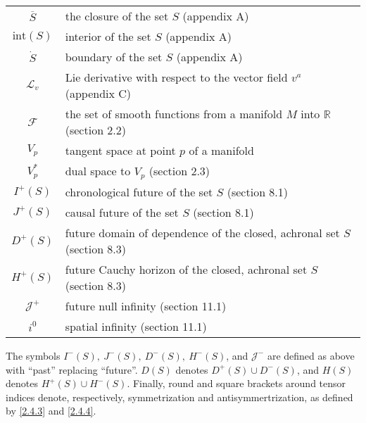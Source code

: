 \begin{table}[!ht]
    \centering
\begin{tabularx}{\textwidth}{c X}
    \toprule
    $\overline{S}$ & the closure of the set $S$ (appendix A)\\
    $\text{int}(S)$ & interior of the set $S$ (appendix A)\\
    $\dot{S}$ & boundary of the set $S$ (appendix A)\\
    $\mathscr{L}_v$ & Lie derivative with respect to the vector field $v^a$ (appendix C)\\
    $\mathscr{F}$ & the set of smooth functions from a manifold $M$ into $\mathbb{R}$ (section 2.2)\\
    $V_p$ & tangent space at point $p$ of a manifold\\
    $V_p^*$ & dual space to $V_p$ (section 2.3)\\
    $I^+(S)$ & chronological future of the set $S$ (section 8.1)\\
    $J^+(S)$ & causal future of the set $S$ (section 8.1)\\
    $D^+(S)$ & future domain of dependence of the closed, achronal set $S$ (section 8.3)\\
    $H^+(S)$ & future Cauchy horizon of the closed, achronal set $S$ (section 8.3)\\
    $\mathscr{J}^+$ & future null infinity (section 11.1)\\
    $i^0$ & spatial infinity (section 11.1)\\
\bottomrule
\end{tabularx}
\end{table}

The symbols $I^-(S),\ J^-(S),\ D^-(S),\ H^-(S)$, and $\mathscr{J}^-$ are defined as above with ``past'' replacing ``future''. $D(S)$ denotes $D^+(S)\cup D^-(S)$, and $H(S)$ denotes $H^+(S)\cup H^-(S)$. Finally, round and square brackets around tensor indices denote, respectively, symmetrization and antisymmertrization, as defined by \eqref{2.4.3} and \eqref{2.4.4}.